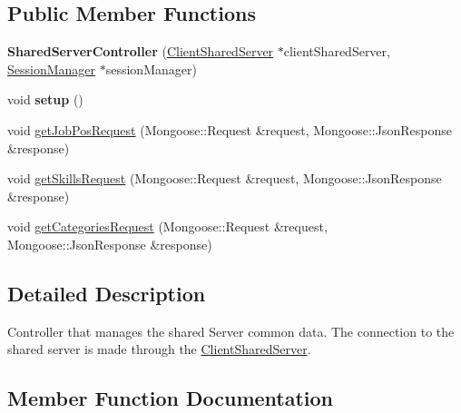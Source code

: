 \subsection*{Public Member Functions}
\begin{DoxyCompactItemize}
\item 
{\bfseries Shared\+Server\+Controller} (\hyperlink{classClientSharedServer}{Client\+Shared\+Server} $\ast$client\+Shared\+Server, \hyperlink{classSessionManager}{Session\+Manager} $\ast$session\+Manager)\hypertarget{classSharedServerController_a355af3c521e77b2a2449831fd71ac20c}{}\label{classSharedServerController_a355af3c521e77b2a2449831fd71ac20c}

\item 
void {\bfseries setup} ()\hypertarget{classSharedServerController_a683f37c601ffa96ff15e06f437447fc9}{}\label{classSharedServerController_a683f37c601ffa96ff15e06f437447fc9}

\item 
void \hyperlink{classSharedServerController_aa6a51bed324007f8218cc789e86cf49d}{get\+Job\+Pos\+Request} (Mongoose\+::\+Request \&request, Mongoose\+::\+Json\+Response \&response)
\item 
void \hyperlink{classSharedServerController_a01df5d05029a370707ff5e0e96a5dd48}{get\+Skills\+Request} (Mongoose\+::\+Request \&request, Mongoose\+::\+Json\+Response \&response)
\item 
void \hyperlink{classSharedServerController_a980bad97792b7af717560eee14a901a4}{get\+Categories\+Request} (Mongoose\+::\+Request \&request, Mongoose\+::\+Json\+Response \&response)
\end{DoxyCompactItemize}


\subsection{Detailed Description}
Controller that manages the shared Server common data. The connection to the shared server is made through the \hyperlink{classClientSharedServer}{Client\+Shared\+Server}. 

\subsection{Member Function Documentation}
